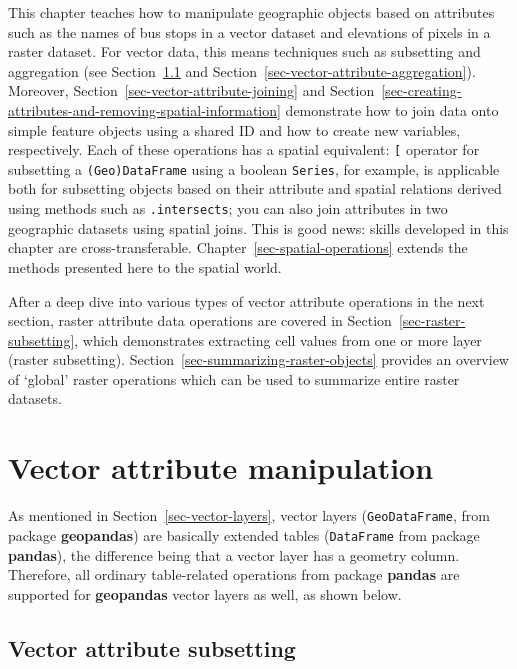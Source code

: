 \documentclass[
  letterpaper,
]{krantz}
\begin{document}
This chapter teaches how to manipulate geographic objects based on
attributes such as the names of bus stops in a vector dataset and
elevations of pixels in a raster dataset. For vector data, this means
techniques such as subsetting and aggregation (see
Section~\ref{sec-vector-attribute-subsetting} and
Section~\ref{sec-vector-attribute-aggregation}). Moreover,
Section~\ref{sec-vector-attribute-joining} and
Section~\ref{sec-creating-attributes-and-removing-spatial-information}
demonstrate how to join data onto simple feature objects using a shared
ID and how to create new variables, respectively. Each of these
operations has a spatial equivalent: \texttt{{[}} operator for
subsetting a \texttt{(Geo)DataFrame} using a boolean \texttt{Series},
for example, is applicable both for subsetting objects based on their
attribute and spatial relations derived using methods such as
\texttt{.intersects}; you can also join attributes in two geographic
datasets using spatial joins. This is good news: skills developed in
this chapter are cross-transferable.
Chapter~\ref{sec-spatial-operations} extends the methods presented here
to the spatial world.

After a deep dive into various types of vector attribute operations in
the next section, raster attribute data operations are covered in
Section~\ref{sec-raster-subsetting}, which demonstrates extracting cell
values from one or more layer (raster subsetting).
Section~\ref{sec-summarizing-raster-objects} provides an overview of
`global' raster operations which can be used to summarize entire raster
datasets.

\section{Vector attribute
manipulation}\label{sec-vector-attribute-manipulation}

As mentioned in Section~\ref{sec-vector-layers}, vector layers
(\texttt{GeoDataFrame}, from package \textbf{geopandas}) are basically
extended tables (\texttt{DataFrame} from package \textbf{pandas}), the
difference being that a vector layer has a geometry column. Therefore,
all ordinary table-related operations from package \textbf{pandas} are
supported for \textbf{geopandas} vector layers as well, as shown below.

\subsection{Vector attribute
subsetting}\label{sec-vector-attribute-subsetting}
\end{document}
